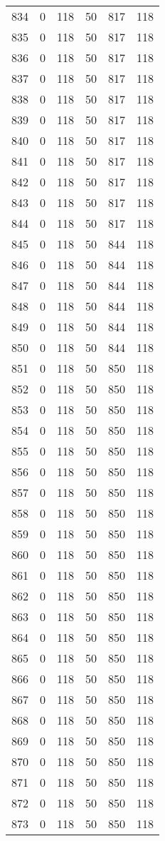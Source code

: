 \documentclass[a4paper]{ctexart}
\begin{document}
\begin{longtable}{p{1cm}|p{2cm}|p{2cm}|p{2cm}|P{2cm}|p{2cm}}
		834&0&118&50&817&118\\
		835&0&118&50&817&118\\
		836&0&118&50&817&118\\
		837&0&118&50&817&118\\
		838&0&118&50&817&118\\
		839&0&118&50&817&118\\
		840&0&118&50&817&118\\
		841&0&118&50&817&118\\
		842&0&118&50&817&118\\
		843&0&118&50&817&118\\
		844&0&118&50&817&118\\
		845&0&118&50&844&118\\
		846&0&118&50&844&118\\
		847&0&118&50&844&118\\
		848&0&118&50&844&118\\
		849&0&118&50&844&118\\
		850&0&118&50&844&118\\
		851&0&118&50&850&118\\
		852&0&118&50&850&118\\
		853&0&118&50&850&118\\
		854&0&118&50&850&118\\
		855&0&118&50&850&118\\
		856&0&118&50&850&118\\
		857&0&118&50&850&118\\
		858&0&118&50&850&118\\
		859&0&118&50&850&118\\
		860&0&118&50&850&118\\
		861&0&118&50&850&118\\
		862&0&118&50&850&118\\
		863&0&118&50&850&118\\
		864&0&118&50&850&118\\
		865&0&118&50&850&118\\
		866&0&118&50&850&118\\
		867&0&118&50&850&118\\
		868&0&118&50&850&118\\
		869&0&118&50&850&118\\
		870&0&118&50&850&118\\
		871&0&118&50&850&118\\
		872&0&118&50&850&118\\
		873&0&118&50&850&118\\

\end{longtable}
\end{document}

